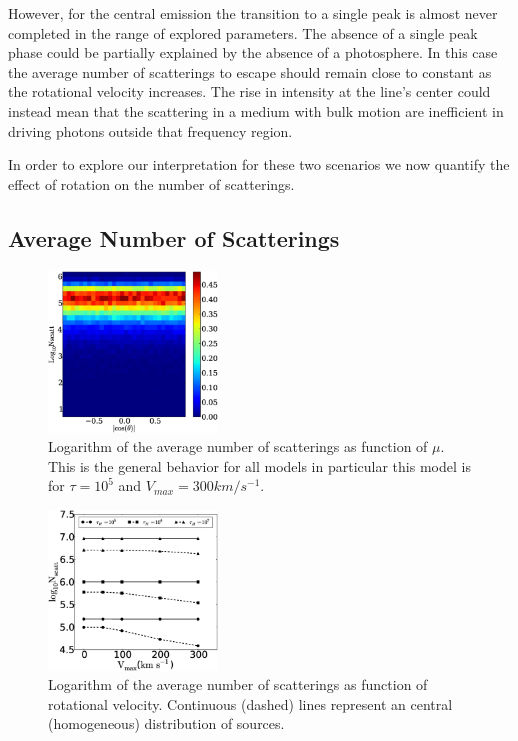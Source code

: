 \documentclass{emulateapj}
\begin{document}
However, for the central emission the transition to a single peak is
almost never completed in the range of explored parameters. The absence
of a single peak phase could be partially explained by the absence of a
photosphere. In this case the average number of scatterings to escape
should remain close to constant as the rotational velocity
increases. The rise in intensity at the line's center could instead
mean that the scattering in a medium with bulk motion are inefficient
in driving photons outside that frequency region.

In order to explore our interpretation for these two scenarios we now 
quantify the effect of rotation on the number of scatterings.

\subsection{Average Number of Scatterings}

\begin{figure}
\begin{center}
    \includegraphics[width=0.40\textwidth]{nscattvsmu.eps}
\end{center}
\caption{Logarithm of the average number of scatterings as function of
  $\mu$. This is the general behavior for all models in particular this model
  is for $\tau=10^{5}$ and $V_{max}=300 km/s^{-1}$. \label{fig:Nscattvsmu}}    
\end{figure}

\begin{figure}
\begin{center}
    \includegraphics[width=0.40\textwidth]{f4.eps}
\end{center}
\caption{Logarithm of the average number of scatterings as function of
  rotational velocity. Continuous (dashed) lines represent an
  central (homogeneous) distribution of sources. \label{fig:Nscatt}}    
\end{figure}
\end{document}
